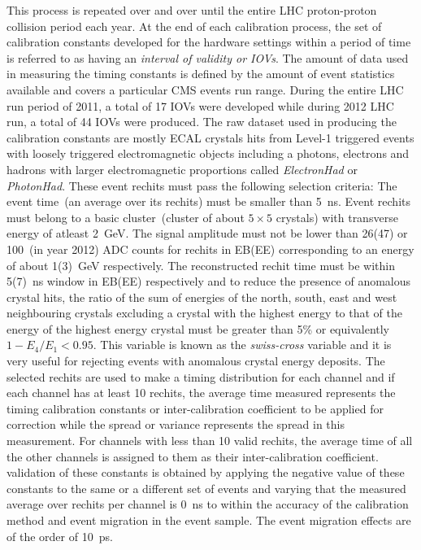 This process is repeated over and over until the entire LHC proton-proton collision period each year. At the end of each calibration process, the set of calibration constants developed for the hardware settings within a period of time is referred to as having an \textit{interval of validity or IOVs}. The amount of data used in measuring the timing constants is defined by the amount of event statistics available and covers a particular CMS events run range. During the entire LHC run period of 2011, a total of 17 IOVs were developed while during 2012 LHC run, a total of 44 IOVs were produced. The raw dataset used in producing the calibration constants are mostly ECAL crystals hits from Level-1 triggered events with loosely triggered electromagnetic objects including a photons, electrons and hadrons with larger electromagnetic proportions called \textit{ElectronHad} or \textit{PhotonHad}. These event rechits must pass the following selection criteria: The event time~(an average over its rechits) must be smaller than 5~ns. Event rechits must belong to a basic cluster~(cluster of about $5\times5$ crystals) with transverse energy of atleast 2~GeV. The signal amplitude must not be lower than 26(47) or 100~(in year 2012) ADC counts for rechits in EB(EE)   corresponding to an energy of about 1(3)~GeV respectively. The reconstructed rechit time must be within 5(7)~ns window in EB(EE) respectively and to reduce the presence of anomalous crystal hits, the ratio of the sum of energies of the north, south, east and west neighbouring crystals excluding a crystal with the highest energy to that of the energy of the highest energy crystal must be greater than 5\%  or equivalently $ 1 - E_{4}/E_{1} < 0.95$. This variable is known as the \textit{swiss-cross} variable and it is very useful for rejecting events with anomalous crystal energy deposits. The selected rechits are used to make a timing distribution for each channel and if each channel has at least 10 rechits, the average time measured represents the timing calibration constants or inter-calibration coefficient to be applied for correction while the spread or variance represents the spread in this measurement. For channels with less than 10 valid rechits, the average time of all the other channels is assigned to them as their inter-calibration coefficient. validation of these constants is obtained by applying the negative value of these constants to the same or a different set of events and varying that the measured average over rechits per channel is 0~ns to within the accuracy of the calibration method and event migration in the event sample. The event migration effects are of the order of 10~ps.
